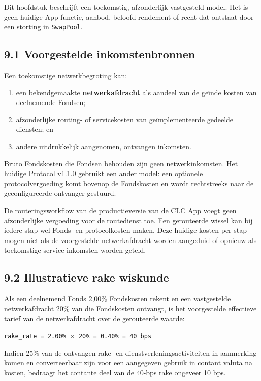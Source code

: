 \documentclass[11pt]{article}
\begin{document}
Dit hoofdstuk beschrijft een toekomstig, afzonderlijk vastgesteld model. Het is geen huidige App-functie, aanbod, beloofd rendement of recht dat ontstaat door een storting in \texttt{SwapPool}.

\subsection*{9.1 Voorgestelde inkomstenbronnen}

Een toekomstige netwerkbegroting kan:

\begin{enumerate}[leftmargin=*]
\item een bekendgemaakte \textbf{netwerkafdracht} als aandeel van de geïnde kosten van deelnemende Fondsen;
\item afzonderlijke routing- of servicekosten van geïmplementeerde gedeelde diensten; en
\item andere uitdrukkelijk aangenomen, ontvangen inkomsten.
\end{enumerate}
Bruto Fondskosten die Fondsen behouden zijn geen netwerkinkomsten. Het huidige Protocol v1.1.0 gebruikt een ander model: een optionele protocolvergoeding komt bovenop de Fondskosten en wordt rechtstreeks naar de geconfigureerde ontvanger gestuurd.

De routeringsworkflow van de productieversie van de CLC App voegt geen afzonderlijke vergoeding voor de routedienst toe. Een gerouteerde wissel kan bij iedere stap wel Fonds- en protocolkosten maken. Deze huidige kosten per stap mogen niet als de voorgestelde netwerkafdracht worden aangeduid of opnieuw als toekomstige service-inkomsten worden geteld.

\subsection*{9.2 Illustratieve rake wiskunde}

Als een deelnemend Fonds 2,00\% Fondskosten rekent en een vastgestelde netwerkafdracht 20\% van die Fondskosten ontvangt, is het voorgestelde effectieve tarief van de netwerkafdracht over de gerouteerde waarde:

\texttt{rake\_rate = 2.00\% $\times$ 20\% = 0.40\% = 40 bps}

Indien 25\% van de ontvangen rake- en dienstverleningsactiviteiten in aanmerking komen en converteerbaar zijn voor een aangegeven gebruik in contant valuta na kosten, bedraagt het contante deel van de 40-bps rake ongeveer 10 bps.
\end{document}

